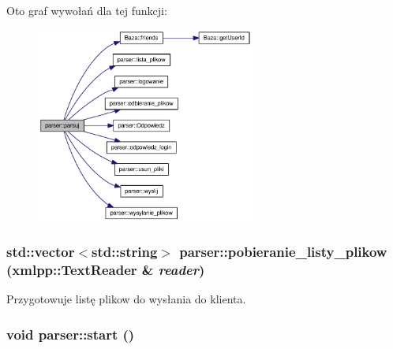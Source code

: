 Oto graf wywołań dla tej funkcji:\nopagebreak
\begin{figure}[H]
\begin{center}
\leavevmode
\includegraphics[width=203pt]{dd/dad/a00005_9ce7290217bd14e4efcbe2cad32ccf95_cgraph}
\end{center}
\end{figure}
\hypertarget{a00005_05500b74ebdcc1578ead4c31fca73a5b}{
\subsubsection[{pobieranie\_\-listy\_\-plikow}]{\setlength{\rightskip}{0pt plus 5cm}std::vector$<$std::string$>$ parser::pobieranie\_\-listy\_\-plikow (xmlpp::TextReader \& {\em reader})}}
\label{dd/dad/a00005_05500b74ebdcc1578ead4c31fca73a5b}


Przygotowuje listę plikow do wysłania do klienta. 

\hypertarget{a00005_7793913f528921aa22c4b6cc259a0a14}{
\subsubsection[{start}]{\setlength{\rightskip}{0pt plus 5cm}void parser::start ()}}
\label{dd/dad/a00005_7793913f528921aa22c4b6cc259a0a14}




